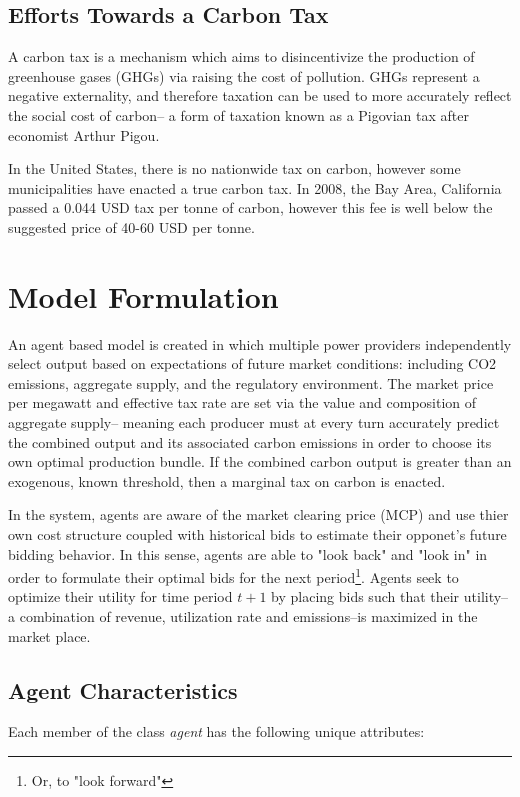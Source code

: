 \documentclass[12pt]{article}
\begin{document}
\subsection{Efforts Towards a Carbon Tax}
A carbon tax is a mechanism which aims to disincentivize the production of greenhouse gases (GHGs) via raising the cost of pollution. GHGs represent a negative externality, and therefore taxation can be used to more accurately reflect the social cost of carbon-- a form of taxation known as a Pigovian tax after economist Arthur Pigou\cite{pigou}. \*

In the United States, there is no nationwide tax on carbon, however some municipalities have enacted a true carbon tax. In 2008, the Bay Area, California passed a 0.044 USD tax per tonne of carbon, however this fee is well below the suggested price of 40-60 USD per tonne\cite{co2tax}. 


\section{Model Formulation}
An agent based model is created in which multiple power providers independently select output based on expectations of future market conditions: including CO2 emissions, aggregate supply, and the regulatory environment. The market price per megawatt and effective tax rate are set via the value and composition of aggregate supply-- meaning each producer must at every turn accurately predict the combined output and its associated carbon emissions in order to choose its own optimal production bundle. If the combined carbon output is greater than an exogenous, known threshold, then a marginal tax on carbon is enacted. \* 

In the system, agents are aware of the market clearing price (MCP) and use thier own cost structure coupled with historical bids to estimate their opponet's future bidding behavior. In this sense, agents are able to "look back" and "look in" in order to formulate their optimal bids for the next period\footnote{Or, to "look forward"}. Agents seek to optimize their utility for time period $t+1$ by placing bids such that their utility-- a combination of revenue, utilization rate and emissions--is maximized in the market place. 

\subsection{Agent Characteristics}
Each member of the class \emph{agent} has the following unique attributes: 
\end{document}
